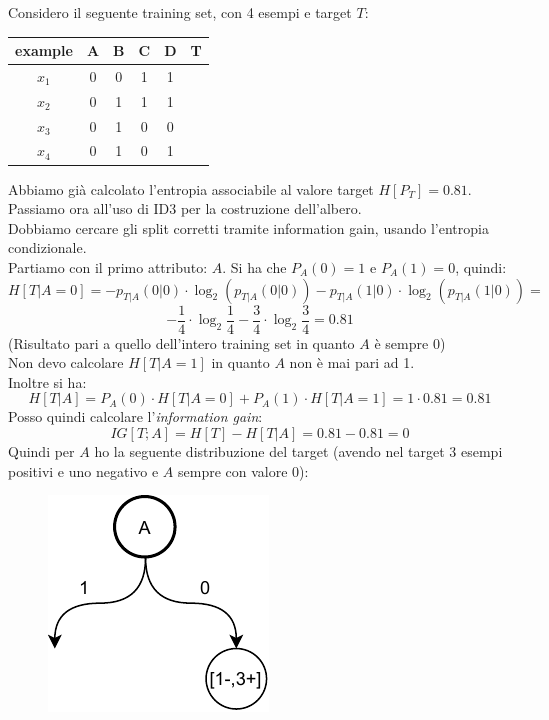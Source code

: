\documentclass[a4paper,12pt, oneside]{book}
\begin{document}
\begin{esercizio}
  Considero il seguente training set, con 4 esempi e target $T$:
  \begin{table}[H]
    \centering
    \begin{tabular}{c|c|c|c|c|c}
      example & A & B & C & D & T\\
      \hline
      $x_1$ & 0 & 0 & 1 & 1 & \color{darkgreen}{1}\\
      $x_2$ & 0 & 1 & 1 & 1 & \color{darkgreen}{1}\\
      $x_3$ & 0 & 1 & 0 & 0 & \color{red}{0}\\
      $x_4$ & 0 & 1 & 0 & 1 & \color{darkgreen}{1}\\
    \end{tabular}
  \end{table}
  Abbiamo già calcolato l'entropia associabile al valore target $H[P_T]=0.81$.\\
  Passiamo ora all'uso di ID3 per la costruzione dell'albero.\\
  Dobbiamo cercare gli split corretti tramite information gain, usando
  l'entropia condizionale.\\
  Partiamo con il primo attributo: $A$. Si ha che $P_A(0)=1$ e $P_A(1)=0$,
  quindi:
  \[H[T|A=0]=-p_{T|A}(0|0)\cdot \log_2(p_{T|A}(0|0))-p_{T|A}(1|0)\cdot
    \log_2(p_{T|A}(1|0))=\]
  \[-\frac{1}{4}\cdot\log_2\frac{1}{4}-
    \frac{3}{4}\cdot\log_2\frac{3}{4}=0.81\]
  (Risultato pari a quello dell'intero training set in quanto $A$ è sempre 0)\\
  Non devo calcolare $H[T|A=1]$ in quanto $A$ non è mai pari ad 1.\\
  Inoltre si ha:
  \[H[T|A]=P_A(0)\cdot H[T|A=0]+P_A(1)\cdot H[T|A=1]=1\cdot 0.81=0.81\]
  Posso quindi calcolare l'\textit{information gain}:
  \[IG[T;A]=H[T]-H[T|A]=0.81-0.81=0\]
  Quindi per $A$ ho la seguente distribuzione del target (avendo nel target 3
  esempi positivi e uno negativo e $A$ sempre con valore 0):
  \begin{figure}[H]
    \centering
    \includegraphics[scale = 0.9]{img/id1.pdf}

\end{figure}
\end{esercizio}
\end{document}

